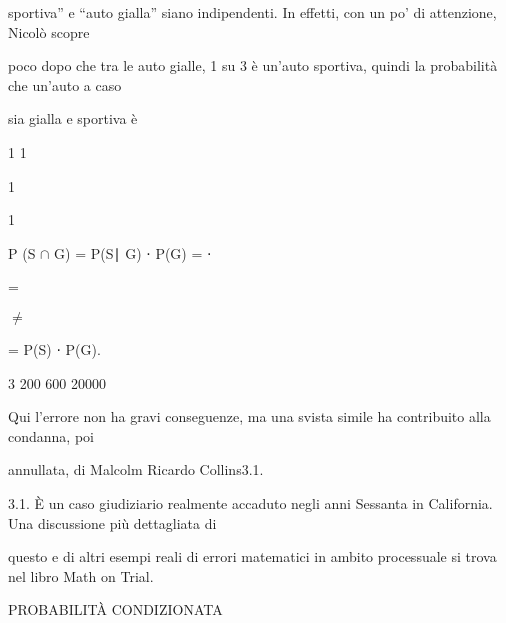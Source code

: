 \documentclass[a4paper,portrait,12pt]{article}
\begin{document}
\begin{flushleft}
sportiva'' e ``auto gialla'' siano indipendenti. In effetti, con un po' di attenzione, Nicol\`{o} scopre
\end{flushleft}


\begin{flushleft}
poco dopo che tra le auto gialle, 1 su 3 \`{e} un'auto sportiva, quindi la probabilit\`{a} che un'auto a caso
\end{flushleft}


\begin{flushleft}
sia gialla e sportiva \`{e}
\end{flushleft}


1 1


1


1


\begin{flushleft}
P (S $\cap$ G) = P(S∣ G) ⋅ P(G) = ⋅
\end{flushleft}


=


$\neq$


\begin{flushleft}
= P(S) ⋅ P(G).
\end{flushleft}


3 200 600 20000


\begin{flushleft}
Qui l'errore non ha gravi conseguenze, ma una svista simile ha contribuito alla condanna, poi
\end{flushleft}


\begin{flushleft}
annullata, di Malcolm Ricardo Collins3.1.
\end{flushleft}


\begin{flushleft}
3.1. \`{E} un caso giudiziario realmente accaduto negli anni Sessanta in California. Una discussione più dettagliata di
\end{flushleft}


\begin{flushleft}
questo e di altri esempi reali di errori matematici in ambito processuale si trova nel libro Math on Trial.
\end{flushleft}










\begin{flushleft}
PROBABILIT\`{A} CONDIZIONATA
\end{flushleft}
\end{document}
